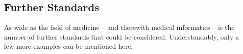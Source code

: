 %
%
%
%
%
%
%

\subsection{Further Standards}
\label{further_standards_heading}

As wide as the field of medicine -- and therewith medical informatics -- is the
number of further standards that could be considered. Understandably, only a
few more examples can be mentioned here.








